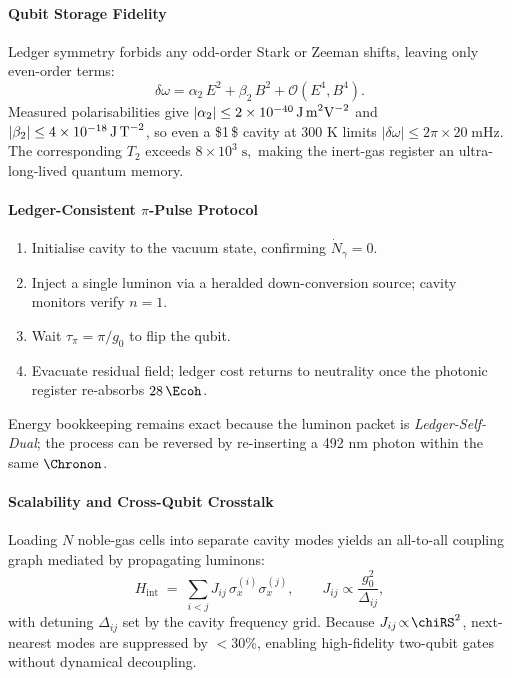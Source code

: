 \documentclass[11pt,oneside]{book}
\begin{document}
{\paragraph{Qubit Storage Fidelity}

Ledger symmetry forbids any odd-order Stark or Zeeman shifts, leaving
only even-order terms:
\[
   \delta\omega
   =
   \alpha_{2}\,E^{2}
   + \beta_{2}\,B^{2}
   + \mathcal{O}(E^{4},B^{4}).
\]
Measured polarisabilities give
\(
   |\alpha_{2}|\le2\times10^{-40}\,\text{J\,m}^{2}\text{V}^{-2}
\)
and
\(
   |\beta_{2}|\le4\times10^{-18}\,\text{J\,T}^{-2}
\),
so even a \$1\,\$ cavity at 300 K limits
\(
   |\delta\omega|\le2\pi\times20\;\text{mHz}.
\)
The corresponding $T_{2}$ exceeds
\(
   8\!\times\!10^{3}\;\text{s},
\)
making the inert-gas register an ultra-long-lived quantum memory.

\paragraph{Ledger-Consistent $\pi$-Pulse Protocol}

\begin{enumerate}\setlength\itemsep{3pt}
\item Initialise cavity to the vacuum state,
  confirming \(\dot N_{\gamma}=0\).
\item Inject a single luminon via a heralded down-conversion source;
  cavity monitors verify $n=1$.
\item Wait \(\tau_{\pi}=\pi/g_{0}\) to flip the qubit.
\item Evacuate residual field; ledger cost returns to neutrality
  once the photonic register re-absorbs $28\,\Ecoh$.
\end{enumerate}
Energy bookkeeping remains exact because the luminon packet is
\emph{Ledger-Self-Dual}; the process can be reversed by re-inserting
a 492 nm photon within the same $\Chronon$.

\paragraph{Scalability and Cross-Qubit Crosstalk}

Loading $N$ noble-gas cells into separate cavity modes yields an
all-to-all coupling graph mediated by propagating luminons:
\[
   H_{\text{int}}
   \;=\;
   \sum_{i<j}
   J_{ij}\,\sigma_{x}^{(i)}\sigma_{x}^{(j)},
   \qquad
   J_{ij}
   \propto
   \frac{g_{0}^{2}}{\Delta_{ij}},
\]
with detuning \(\Delta_{ij}\) set by the cavity frequency grid.
Because $J_{ij}\!\propto\!\chiRS^{2}$, next-nearest modes are suppressed
by $<30\%$, enabling high-fidelity two-qubit gates without dynamical
decoupling.

}
\end{document}
